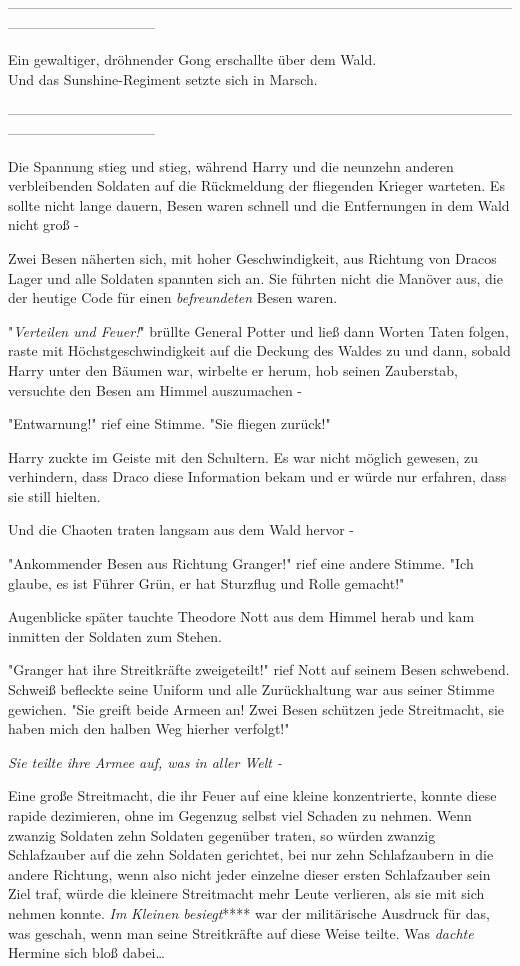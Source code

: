 {--------------------------------------------------------------------------------------------------------------------------------------------

Ein gewaltiger, dröhnender Gong erschallte über dem Wald.\\ Und das Sunshine-Regiment setzte sich in Marsch.

--------------------------------------------------------------------------------------------------------------------------------------------

Die Spannung stieg und stieg, während Harry und die neunzehn anderen verbleibenden Soldaten auf die Rückmeldung der fliegenden Krieger warteten. Es sollte nicht lange dauern, Besen waren schnell und die Entfernungen in dem Wald nicht groß -

Zwei Besen näherten sich, mit hoher Geschwindigkeit, aus Richtung von Dracos Lager und alle Soldaten spannten sich an. Sie führten nicht die Manöver aus, die der heutige Code für einen \emph{befreundeten} Besen waren.

"\emph{Verteilen und Feuer!}" brüllte General Potter und ließ dann Worten Taten folgen, raste mit Höchstgeschwindigkeit auf die Deckung des Waldes zu und dann, sobald Harry unter den Bäumen war, wirbelte er herum, hob seinen Zauberstab, versuchte den Besen am Himmel auszumachen -

"Entwarnung!" rief eine Stimme. "Sie fliegen zurück!"

Harry zuckte im Geiste mit den Schultern. Es war nicht möglich gewesen, zu verhindern, dass Draco diese Information bekam und er würde nur erfahren, dass sie still hielten.

Und die Chaoten traten langsam aus dem Wald hervor -

"Ankommender Besen aus Richtung Granger!" rief eine andere Stimme. "Ich glaube, es ist Führer Grün, er hat Sturzflug und Rolle gemacht!"

Augenblicke später tauchte Theodore Nott aus dem Himmel herab und kam inmitten der Soldaten zum Stehen.

"Granger hat ihre Streitkräfte zweigeteilt!" rief Nott auf seinem Besen schwebend. Schweiß befleckte seine Uniform und alle Zurückhaltung war aus seiner Stimme gewichen. "Sie greift beide Armeen an! Zwei Besen schützen jede Streitmacht, sie haben mich den halben Weg hierher verfolgt!"

\emph{Sie teilte ihre Armee auf, was in aller Welt -}

Eine große Streitmacht, die ihr Feuer auf eine kleine konzentrierte, konnte diese rapide dezimieren, ohne im Gegenzug selbst viel Schaden zu nehmen. Wenn zwanzig Soldaten zehn Soldaten gegenüber traten, so würden zwanzig Schlafzauber auf die zehn Soldaten gerichtet, bei nur zehn Schlafzaubern in die andere Richtung, wenn also nicht jeder einzelne dieser ersten Schlafzauber sein Ziel traf, würde die kleinere Streitmacht mehr Leute verlieren, als sie mit sich nehmen konnte. \emph{Im} \emph{Kleinen besiegt}**** war der militärische Ausdruck für das, was geschah, wenn man seine Streitkräfte auf diese Weise teilte. Was \emph{dachte} Hermine sich bloß dabei…

}
